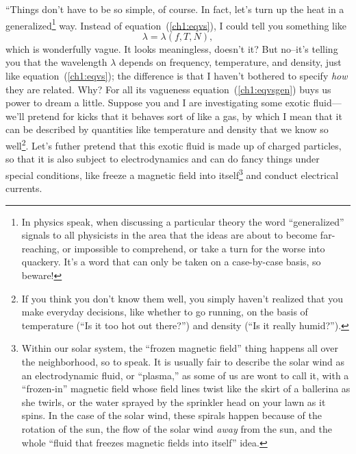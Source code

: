 \X ``Things don't have to be so simple, of course. In fact, let's turn
up the heat in a generalized\footnote{In physics speak, when
  discussing a particular theory the word ``generalized'' signals to
  all physicists in the area that the ideas are about to become
  far-reaching, or impossible to comprehend, or take a turn for the
  worse into quackery. It's a word that can only be taken on a
  case-by-case basis, so beware!} way. Instead of
equation~(\ref{ch1:eqvs}), I could tell you something like
\begin{equation}
  \label{ch1:eqvsgen}
  \lambda = \lambda (f,T,N),
\end{equation}
which is wonderfully vague. It looks meaningless, doesn't it? But
no--it's telling you that the wavelength $\lambda$ depends on
frequency, temperature, and density, just like
equation~(\ref{ch1:eqvs}); the difference is that I haven't bothered
to specify \emph{how} they are related. Why? For all its vagueness
equation~(\ref{ch1:eqvsgen}) buys us power to dream a little. Suppose
you and I are investigating some exotic fluid---we'll pretend for
kicks that it behaves sort of like a gas, by which I mean that it can
be described by quantities like temperature and density that we know
so well\footnote{If you think you don't know them well, you simply
  haven't realized that you make everyday decisions, like whether to
  go running, on the basis of temperature (``Is it too hot out
  there?'') and density (``Is it really humid?'').}. Let's futher
pretend that this exotic fluid is made up of charged particles, so
that it is also subject to electrodynamics and can do fancy things
under special conditions, like freeze a magnetic field into
itself\footnote{Within our solar system, the ``frozen magnetic field''
  thing happens all over the neighborhood, so to speak. It is usually
  fair to describe the solar wind as an electrodynamic fluid, or
  ``plasma,'' as some of us are wont to call it, with a ``frozen-in''
  magnetic field whose field lines twist like the skirt of a ballerina
  as she twirls, or the water sprayed by the sprinkler head on your
  lawn as it spins. In the case of the solar wind, these spirals
  happen because of the rotation of the sun, the flow of the solar
  wind \emph{away} from the sun, and the whole ``fluid that freezes
  magnetic fields into itself'' idea.} and conduct electrical
currents.

